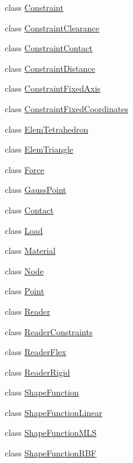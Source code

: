 \begin{DoxyCompactItemize}
\item 
class \hyperlink{classmknix_1_1_constraint}{Constraint}
\item 
class \hyperlink{classmknix_1_1_constraint_clearance}{Constraint\-Clearance}
\item 
class \hyperlink{classmknix_1_1_constraint_contact}{Constraint\-Contact}
\item 
class \hyperlink{classmknix_1_1_constraint_distance}{Constraint\-Distance}
\item 
class \hyperlink{classmknix_1_1_constraint_fixed_axis}{Constraint\-Fixed\-Axis}
\item 
class \hyperlink{classmknix_1_1_constraint_fixed_coordinates}{Constraint\-Fixed\-Coordinates}
\item 
class \hyperlink{classmknix_1_1_elem_tetrahedron}{Elem\-Tetrahedron}
\item 
class \hyperlink{classmknix_1_1_elem_triangle}{Elem\-Triangle}
\item 
class \hyperlink{classmknix_1_1_force}{Force}
\item 
class \hyperlink{classmknix_1_1_gauss_point}{Gauss\-Point}
\item 
class \hyperlink{classmknix_1_1_contact}{Contact}
\item 
class \hyperlink{classmknix_1_1_load}{Load}
\item 
class \hyperlink{classmknix_1_1_material}{Material}
\item 
class \hyperlink{classmknix_1_1_node}{Node}
\item 
class \hyperlink{classmknix_1_1_point}{Point}
\item 
class \hyperlink{classmknix_1_1_reader}{Reader}
\item 
class \hyperlink{classmknix_1_1_reader_constraints}{Reader\-Constraints}
\item 
class \hyperlink{classmknix_1_1_reader_flex}{Reader\-Flex}
\item 
class \hyperlink{classmknix_1_1_reader_rigid}{Reader\-Rigid}
\item 
class \hyperlink{classmknix_1_1_shape_function}{Shape\-Function}
\item 
class \hyperlink{classmknix_1_1_shape_function_linear}{Shape\-Function\-Linear}
\item 
class \hyperlink{classmknix_1_1_shape_function_m_l_s}{Shape\-Function\-M\-L\-S}
\item 
class \hyperlink{classmknix_1_1_shape_function_r_b_f}{Shape\-Function\-R\-B\-F}
\item 

\end{DoxyCompactItemize}
